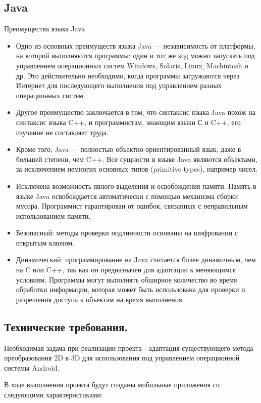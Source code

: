 \subsection{Java}
Преимущества языка Java
\begin{itemize}
	\item Одно из основных преимуществ языка Java — независимость от платформы, на которой выполняются программы: один и тот же код можно запускать под управлением операционных систем Windows, Solaris, Linux, Machintosh и др. 
	Это действительно необходимо, когда программы загружаются через Интернет для последующего выполнения под управлением разных операционных систем.
	\item Другое преимущество заключается в том, что синтаксис языка Java похож на синтаксис языка C++, и программистам, знающим языки С и C++, его изучение не составляет труда.
	\item Кроме того, Java — полностью объектно-ориентированный язык, даже в большей степени, чем C++. Все сущности в языке Java являются объектами, за исключением немногих основных типов (primitive types), например чисел.
	\item Исключена возможность явного выделения и освобождения памяти.	Память в языке Java освобождается автоматически с помощью механизма сборки мусора. Программист гарантирован от ошибок, связанных с неправильным использованием памяти.
	\item Безопасный: методы проверки подлинности основаны на шифровании с открытым ключом.
	\item Динамический: программирование на Java считается более динамичным, чем на C или C++, так как он предназначен для адаптации к меняющимся условиям. Программы могут выполнять обширное количество во время обработки информации, которая может быть использована для проверки и разрешения доступа к объектам на время выполнения.
\end{itemize}

\subsection{Технические требования.}

Необходимая задача при реализации проекта - адаптация существующего метода преобразования 2D в 3D для использования под управлением операционной системы Android.

В ходе выполнения проекта будут созданы мобильные приложения со следующими характеристиками:

